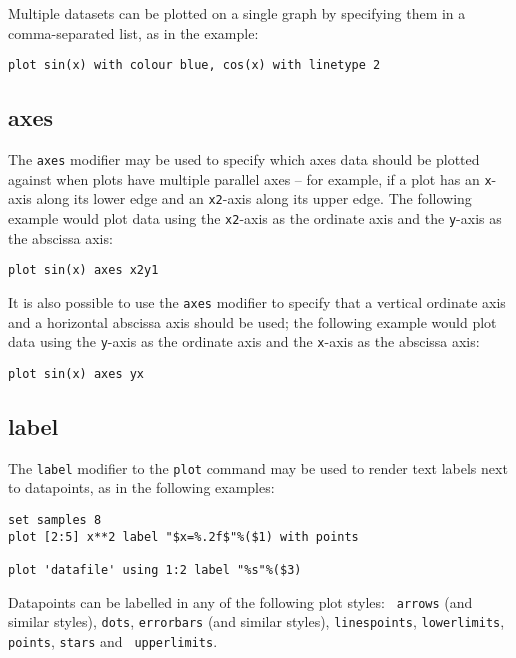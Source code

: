 Multiple datasets can be plotted on a single graph by specifying them in a
comma-separated list, as in the example:

\begin{verbatim}
plot sin(x) with colour blue, cos(x) with linetype 2
\end{verbatim}


\subsection{axes}

The {\tt axes} modifier may be used to specify which axes data should be
plotted against when plots have multiple parallel axes -- for example, if a
plot has an {\tt x}-axis along its lower edge and an {\tt x2}-axis along its
upper edge. The following example would plot data using the {\tt x2}-axis as
the ordinate axis and the {\tt y}-axis as the abscissa axis:

\begin{verbatim}
plot sin(x) axes x2y1
\end{verbatim}

\noindent It is also possible to use the {\tt axes} modifier to specify that a
vertical ordinate axis and a horizontal abscissa axis should be used; the
following example would plot data using the {\tt y}-axis as the ordinate axis
and the {\tt x}-axis as the abscissa axis:

\begin{verbatim}
plot sin(x) axes yx
\end{verbatim}


\subsection{label}

The {\tt label} modifier to the {\tt plot} command may be used to render text 
labels next to datapoints, as in the following examples:
\begin{verbatim}
set samples 8
plot [2:5] x**2 label "$x=%.2f$"%($1) with points

plot 'datafile' using 1:2 label "%s"%($3)
\end{verbatim}

\noindent Datapoints can be labelled in any of the following plot styles: {\tt 
arrows} (and similar styles), {\tt dots}, {\tt errorbars} (and similar styles),
{\tt linespoints}, {\tt lowerlimits}, {\tt points}, {\tt stars} and {\tt
upperlimits}.


